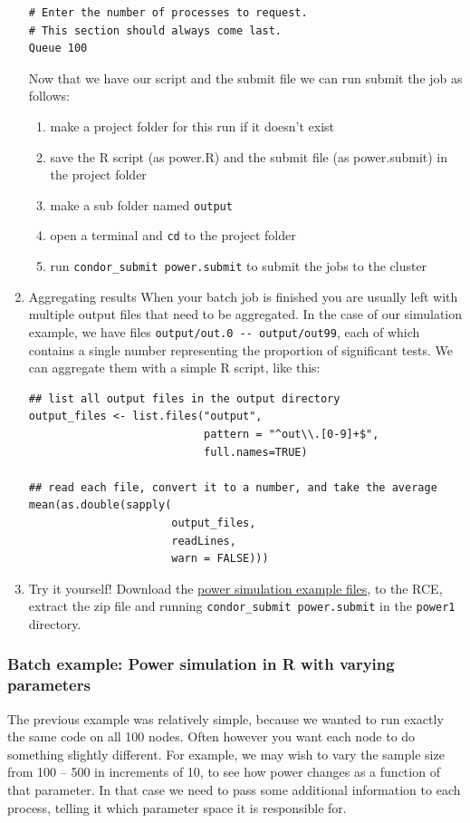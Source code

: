 \documentclass[11pt]{article}
\begin{document}
\begin{enumerate}
\begin{verbatim}
# Enter the number of processes to request.
# This section should always come last.
Queue 100
\end{verbatim}

Now that we have our script and the submit file we can run submit the job as follows:
\begin{enumerate}
\item make a project folder for this run if it doesn't exist
\item save the R script (as power.R) and the submit file (as power.submit) in the project folder
\item make a sub folder named \texttt{output}
\item open a terminal and \texttt{cd} to the project folder
\item run \texttt{condor\_submit power.submit} to submit the jobs to the cluster
\end{enumerate}

\item Aggregating results
\label{sec:org9bac4d5}
When your batch job is finished you are usually left with multiple output files that need to be aggregated. In the case of our simulation example, we have files \texttt{output/out.0 -{}- output/out99}, each of which contains a single number representing the proportion of significant tests. We can aggregate them with a simple R script, like this:
\begin{verbatim}
## list all output files in the output directory
output_files <- list.files("output",
                           pattern = "^out\\.[0-9]+$",
                           full.names=TRUE)

## read each file, convert it to a number, and take the average
mean(as.double(sapply(
                      output_files,
                      readLines,
                      warn = FALSE)))
\end{verbatim}

\item Try it yourself!
\label{sec:org2236a4d}
Download the \href{R\_examples/power1.zip}{power simulation example files}, to the RCE, extract the zip file and running \texttt{condor\_submit power.submit} in the \texttt{power1} directory.
\end{enumerate}

\subsubsection{Batch example: Power simulation in R with varying parameters}
\label{sec:org0b3a0c0}
The previous example was relatively simple, because we wanted to run exactly the same code on all 100 nodes. Often however you want each node to do something slightly different. For example, we may wish to vary the sample size from 100 -- 500 in increments of 10, to see how power changes as a function of that parameter. In that case we need to pass some additional information to each process, telling it which parameter space it is responsible for. 
\end{document}
